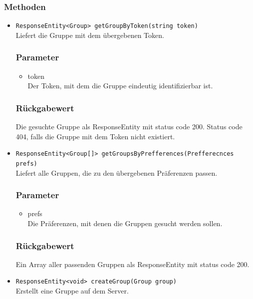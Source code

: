 \documentclass[a4paper]{scrreprt}
\begin{document}
\subsubsection*{Methoden}
\begin{addmargin}[25pt]{0pt}
\begin{itemize}

\item \texttt{ResponseEntity<Group> getGroupByToken(string token)}\\
	Liefert die Gruppe mit dem übergebenen Token. 

	\subsubsection*{Parameter}
	\begin{itemize}
	\item token \\
		Der Token, mit dem die Gruppe eindeutig identifizierbar ist.
	\end{itemize}

	\subsubsection*{Rückgabewert}
	Die gesuchte Gruppe als ResponseEntity mit status code 200.
	Status code 404, falls die Gruppe mit dem Token nicht existiert.

\item \texttt{ResponseEntity<Group[]> getGroupsByPrefferences(Prefferecnces prefs)}\\
	Liefert alle Gruppen, die zu den übergebenen Präferenzen passen.

	\subsubsection*{Parameter}
	\begin{itemize}
	\item prefs \\
		Die Präferenzen, mit denen die Gruppen gesucht werden sollen.
	\end{itemize}

	\subsubsection*{Rückgabewert}
	Ein Array aller passenden Gruppen als ResponseEntity mit status code 200.
	
\item \texttt{ResponseEntity<void> createGroup(Group group)}\\
	Erstellt eine Gruppe auf dem Server.


\end{itemize}
\end{addmargin}
\end{document}
